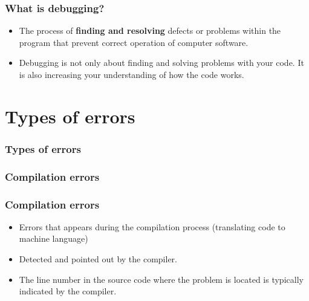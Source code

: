 \documentclass[t]{myBeamer}
\begin{document}
\begin{frame}[t]
\frametitle{ \huge What is debugging?}
  \centering 
  \Large  
  \begin{itemize}
    \item The process of \textbf{finding and resolving} defects or problems within the program that prevent correct operation of computer software.
    \item Debugging is not only about finding and solving problems with your code. It is also increasing your understanding of how the code works.
    \end{itemize}

\end{frame}

\section{Types of errors} 
\begin{frame}[t]
\frametitle{ \huge Types of errors }
  
  
  \begin{tightBox}
  \centering 
  \end{tightBox}
\end{frame}  



\subsubsection{Compilation errors} 
\begin{frame}[t]
\frametitle{ \huge Compilation errors }
\Large
\begin{itemize}
  \item Errors that appears during the compilation process (translating code to machine language)  
  \item Detected and pointed out by the compiler.  
  \item The line number in the source code where the problem is located is typically indicated by the compiler.
\end{itemize}
\end{frame}
\end{document}
